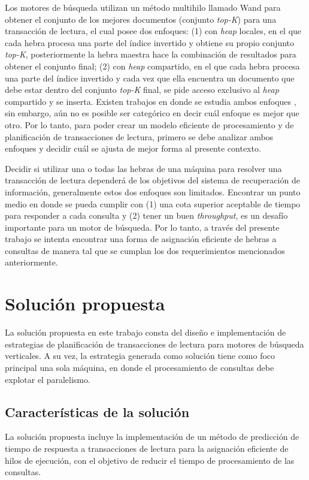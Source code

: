 Los motores de búsqueda utilizan un método multihilo llamado Wand para obtener el conjunto de los mejores documentos (conjunto \textit{top-K}) para una transacción de lectura, el cual posee dos enfoques: (1) con \textit{heap} locales, en el que cada hebra procesa una parte del índice invertido y obtiene su propio conjunto \textit{top-K}, posteriormente la hebra maestra hace la combinación de resultados para obtener el conjunto final; (2) con \textit{heap} compartido, en el que cada hebra procesa una parte del índice invertido y cada vez que ella encuentra un documento que debe estar dentro del conjunto \textit{top-K} final, se pide acceso exclusivo al \textit{heap} compartido y se inserta. Existen trabajos en donde se estudia ambos enfoques \citep{Rojas:2013}, sin embargo, aún no es posible ser categórico en decir cuál enfoque es mejor que otro. Por lo tanto, para poder crear un modelo eficiente de procesamiento y de planificación de transacciones de lectura, primero se debe analizar ambos enfoques y decidir cuál se ajusta de mejor forma al presente contexto.

Decidir si utilizar una o todas las hebras de una máquina para resolver una transacción de lectura dependerá de los objetivos del sistema de recuperación de información, generalmente estos dos enfoques son limitados. Encontrar un punto medio en donde se pueda cumplir con (1) una cota superior aceptable de tiempo para responder a cada consulta y (2) tener un buen \textit{throughput}, es un desafío importante para un motor de búsqueda. Por lo tanto, a través del presente trabajo se intenta encontrar una forma de asignación eficiente de hebras a consultas de manera tal que se cumplan los dos requerimientos mencionados anteriormente. 


\section{Solución propuesta}
\label{intro:solucionpropuesta}
La solución propuesta en este trabajo consta del diseño e implementación de estrategias de planificación de transacciones de lectura para motores de búsqueda verticales. A su vez, la estrategia generada como solución tiene como foco principal una sola máquina, en donde el procesamiento de consultas debe explotar el paralelismo. 


\subsection{Caracter\'isticas de la solución}
\label{intro:caracteristicassolucion}
La solución propuesta incluye la implementación de un método de predicción de tiempo de respuesta a transacciones de lectura para la asignación eficiente de hilos de ejecución, con el objetivo de reducir el tiempo de procesamiento de las consultas. 

